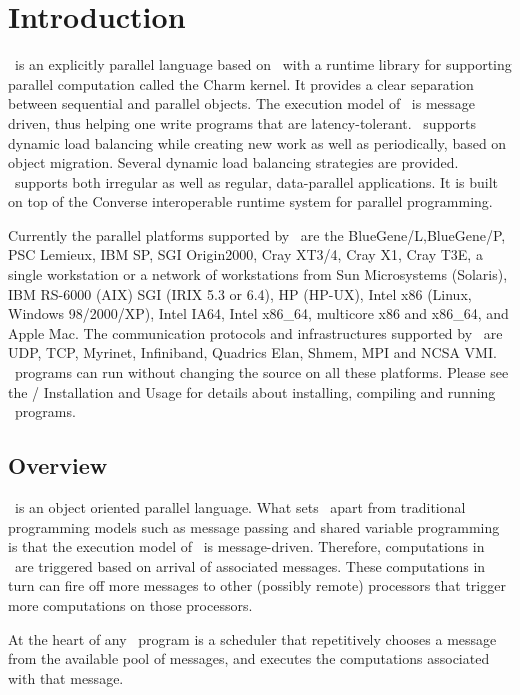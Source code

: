 \section{Introduction}

\charmpp\ is an explicitly parallel language based on \CC\ with a runtime
library for supporting parallel computation called the Charm kernel.  It
provides a clear separation between sequential and parallel objects.  The
execution model of \charmpp\ is message driven, thus helping one write programs
that are latency-tolerant.  \charmpp\ supports dynamic load balancing while
creating new work as well as periodically, based on object migration.  Several
dynamic load balancing strategies are provided.  \charmpp\ supports both
irregular as well as regular, data-parallel applications.  It is built on top of the
{\sc Converse} interoperable runtime system for parallel programming.

Currently the parallel platforms supported by \charmpp\ are the BlueGene/L,BlueGene/P, PSC
Lemieux, IBM SP, SGI Origin2000, Cray XT3/4, Cray X1, Cray T3E, a single workstation or a
network of workstations from Sun Microsystems (Solaris), IBM RS-6000 (AIX) SGI
(IRIX 5.3 or 6.4), HP (HP-UX), Intel x86 (Linux, Windows 98/2000/XP), Intel
IA64, Intel x86\_64, multicore x86 and x86\_64, and Apple Mac. The communication protocols and infrastructures supported
by \charmpp\ are UDP, TCP, Myrinet, Infiniband, Quadrics Elan, Shmem, MPI and
NCSA VMI.  \charmpp\ programs can run without changing the source on all these
platforms.  Please see the \charmpp{}/\converse{} Installation and
Usage 
for details about installing, compiling and running \charmpp\ programs.

\subsection{Overview}

\charmpp\ is an object oriented parallel language. What sets \charmpp\ apart
from traditional programming models such as message passing and shared variable
programming is that the execution model of \charmpp\ is message-driven.
Therefore, computations in \charmpp\ are triggered based on arrival of
associated messages. These computations in turn can fire off more messages to
other (possibly remote) processors that trigger more computations on those
processors.

At the heart of any \charmpp\ program is a scheduler that repetitively chooses
a message from the available pool of messages, and executes the computations
associated with that message.


